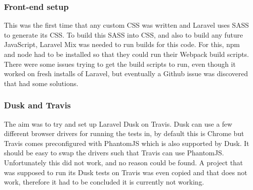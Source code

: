 \subsubsection{Front-end setup}
This was the first time that any custom CSS was written and Laravel uses SASS to generate its CSS. To build this SASS into CSS, and also to build any future JavaScript, Laravel Mix was needed to run builds for this code. For this, npm and node had to be installed so that they could run their Webpack build scripts. There were some issues trying to get the build scripts to run, even though it worked on fresh installs of Laravel, but eventually a Github issue was discovered that had some solutions\cite{broken-mix}.
\subsubsection{Dusk and Travis}
The aim was to try and set up Laravel Dusk on Travis. Dusk can use a few different browser drivers for running the tests in, by default this is Chrome but Travis comes preconfigured with PhantomJS which is also supported by Dusk. It should be easy to swap the drivers such that Travis can use PhantomJS. Unfortunately this did not work, and no reason could be found. A project that was supposed to run its Dusk tests on Travis was even copied and that does not work, therefore it had to be concluded it is currently not working.
\newpage
